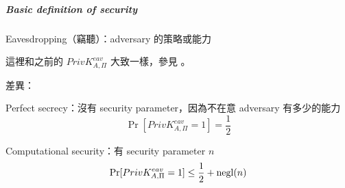 \subparagraph{Basic definition of security}

Eavesdropping（竊聽）：adversary 的策略或能力

這裡和之前的 \(PrivK_{A, \Pi}^{eav}\) 大致一樣，參見 。

差異：
\begin{myItemize}
	\item Perfect secrecy：沒有 security parameter，因為不在意 adversary 有多少的能力
		\[\Pr[PrivK_{A, \Pi}^{eav} = 1] = \frac{1}{2}\]
	\item Computational security：有 security parameter \(n\)
		\[\Pr[PrivK_{A, \Pi}^{eav} = 1] \leq \frac{1}{2} + \operatorname{negl}(n)\]
\end{myItemize}

